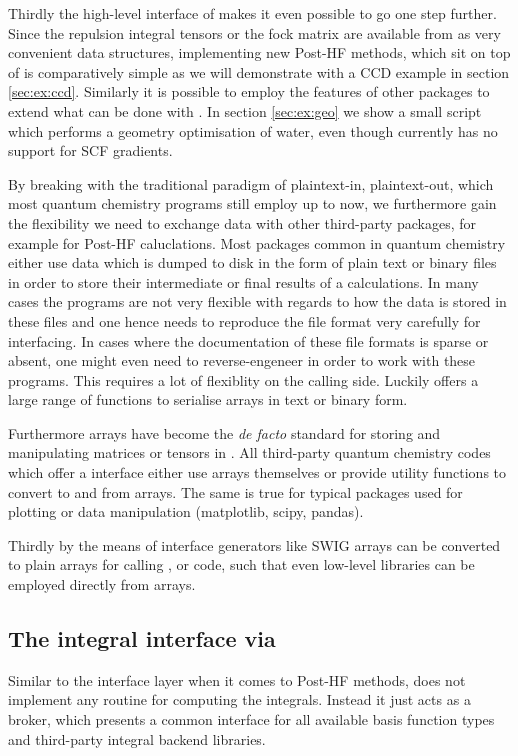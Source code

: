 Thirdly the high-level \python interface of \molsturm 
makes it even possible to go one step further.
Since the repulsion integral tensors or the fock matrix
are available from \molsturm as very convenient data structures,
implementing new Post-HF methods,
which sit on top of \molsturm is comparatively simple
as we will demonstrate with a CCD example in section \ref{sec:ex:ccd}.
Similarly it is possible to employ the features of other \python
packages to extend what can be done with \molsturm.
In section \ref{sec:ex:geo} we show a small \python script
which performs a geometry optimisation of water,
even though \molsturm currently has no support for SCF gradients.

By breaking with the traditional paradigm of plaintext-in, plaintext-out,
which most quantum chemistry programs still employ up to now,
we furthermore gain the flexibility we need to exchange data with
other third-party packages, for example for Post-HF caluclations.
Most packages common in quantum chemistry either use data which is
dumped to disk in the form of plain text or binary files
in order to store their intermediate or final results of
a calculations.
In many cases the programs are not very flexible with regards to
how the data is stored in these files and one hence needs to reproduce
the file format very carefully for interfacing.
In cases where the documentation of these file formats is sparse
or absent,
one might even need to reverse-engeneer in order to work with these programs.
This requires a lot of flexiblity on the calling side.
Luckily \python offers a large range of functions to serialise \numpy
arrays in text or binary form.

Furthermore \numpy arrays have become the \textit{de facto} standard
for storing and manipulating matrices or tensors in \python.
All third-party quantum chemistry codes which
offer a \python interface
either use \numpy arrays themselves or
provide utility functions to convert to and
from \numpy arrays.
The same is true for typical \python packages used for plotting or
data manipulation (matplotlib, scipy, pandas).

Thirdly by the means of interface generators
like SWIG  \numpy arrays can be converted to plain
\cee arrays for calling \cpp, \cee or \fortran code,
such that even low-level libraries can be employed directly
from \numpy arrays.

%
%
\subsection{The integral interface via \gint}
Similar to the \molsturm interface layer when it comes to Post-HF methods,
\gint does not implement any routine for computing the integrals.
Instead it just acts as a broker,
which presents a common interface for all available basis function types
and third-party integral backend libraries.

